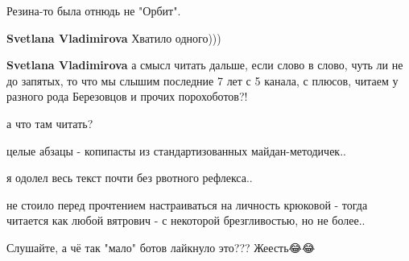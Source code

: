 \begin{itemize}
\begin{itemize}
 
Резина-то была отнюдь не "Орбит".

 
\textbf{Svetlana Vladimirova}
Хватило одного)))

 
\textbf{Svetlana Vladimirova} а смысл читать дальше, если слово в слово, чуть ли не до запятых, то что мы слышим последние 7 лет с 5 канала, с плюсов, читаем у разного рода Березовцов и прочих порохоботов?!

 

а что там читать?

целые абзацы - копипасты из стандартизованных майдан-методичек..

я одолел весь текст почти без рвотного рефлекса..

не стоило перед прочтением настраиваться на личность крюковой - тогда читается
как любой вятрович - с некоторой брезгливостью, но не более..

\end{itemize}

 
Слушайте, а чё так "мало" ботов лайкнуло это??? Жеесть😂😂

 


\end{itemize}
